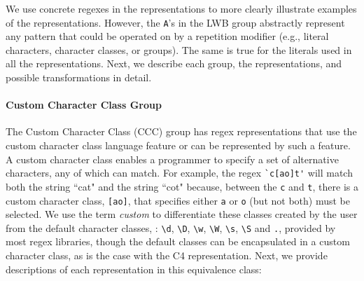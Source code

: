 We use concrete regexes in the representations to more clearly illustrate examples of the representations. However, the \verb!A!'s in the LWB group abstractly represent any pattern that could be operated on by a repetition modifier (e.g., literal characters, character classes, or groups). The same is true for the literals used in all the representations. 
Next, we describe each group, the representations, and possible transformations in detail.

\paragraph{Custom Character Class Group}
The Custom Character Class (CCC) group has regex representations that use the custom character class language feature or can be represented by such a feature.
 A custom character class enables a programmer to specify a set of alternative characters, any of which can match.  For example, the regex \verb!`c[ao]t'! will match both the string ``cat" and the string ``cot" because, between the \verb!c! and \verb!t!, there is a custom character class, \verb![ao]!, that specifies either \verb!a! or \verb!o! (but not both) must be selected.  We use the term \emph{custom} to differentiate these classes created by the user from the default character classes, : \verb!\d!, \verb!\D!, \verb!\w!, \verb!\W!, \verb!\s!, \verb!\S! and \verb!.!,  provided by most regex libraries, though the default classes can be encapsulated in a custom character class, as is the case with the C4 representation.
Next, we provide descriptions of each representation in this equivalence class:

